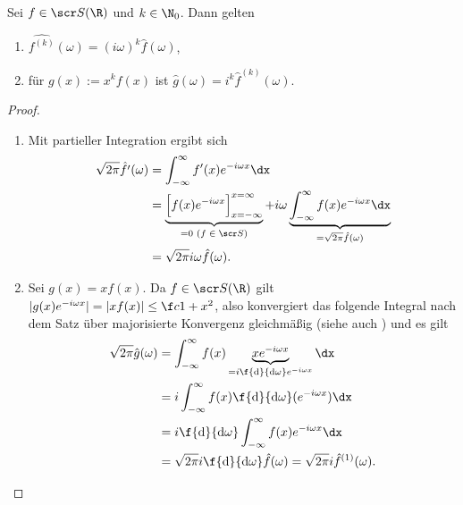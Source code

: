 \begin{st} \label{4.7}
	Sei $f \in \scr S(\R)$ und $k \in \N_0$.
	Dann gelten
	\begin{enumerate}[1)]
		\item
			$\widehat {f^{(k)}}(\omega) = (i \omega)^k \hat f(\omega)$,
		\item
			für $g(x) := x^k f(x)$ ist $\hat g(\omega) = i^k \hat f^{(k)} (\omega)$.
	\end{enumerate}
	\begin{proof}
		\begin{enumerate}[1)]
			\item
				Mit partieller Integration ergibt sich
				\begin{align*}
					\sqrt {2\pi} \hat{f'}(\omega)
					&= \int_{-\infty}^\infty f'(x) e^{-i\omega x} \dx \\
					&= \underbrace{\Big[f(x) e^{-i\omega x}  \Big]_{x=-\infty}^{x=\infty}}_{=0 \text{ ($f \in \scr S$)}} + i\omega \underbrace{\int_{-\infty}^\infty f(x) e^{-i\omega x} \dx}_{= \sqrt{2\pi} \hat f(\omega)} \\
					&= \sqrt{2\pi} i \omega \hat f(\omega).
				\end{align*}
			\item
				Sei $g(x) = x f(x)$.
				Da $f \in \scr S(\R)$ gilt $|g(x) e^{-i\omega x}| = |xf(x)| \le \f c{1+x^2}$, also konvergiert das folgende Integral nach dem Satz über majorisierte Konvergenz gleichmäßig (siehe auch ) und es gilt
				\begin{align*}
					\sqrt{2\pi} \hat g(\omega)
					&= \int_{-\infty}^\infty f(x) \underbrace{ xe^{-i \omega x}}_{= i \f{\mathrm d}{\mathrm d \omega} e^{-i \omega x}} \dx \\
					&= i \int_{-\infty}^\infty f(x) \f {\mathrm d}{\mathrm d \omega} (e^{-i \omega x}) \dx \\
					&= i \f {\mathrm d}{\mathrm d \omega} \int_{-\infty}^\infty f(x) e^{-i \omega x} \dx \\
					&=\sqrt{2\pi} i \f {\mathrm d}{\mathrm d \omega} \hat f(\omega)
					= \sqrt{2\pi} i {\hat f}^{(1)} (\omega).
				\end{align*}
		\end{enumerate}
	\end{proof}
\end{st}


